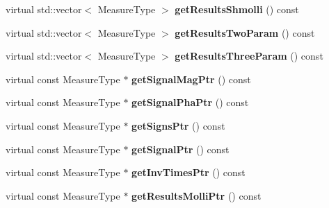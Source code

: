 \begin{DoxyCompactItemize}
\item 
\hypertarget{class_ox_1_1_test_data_aece21264e7f357c50e2d157f077127f5}{virtual std\-::vector$<$ Measure\-Type $>$ {\bfseries get\-Results\-Shmolli} () const }\label{class_ox_1_1_test_data_aece21264e7f357c50e2d157f077127f5}

\item 
\hypertarget{class_ox_1_1_test_data_a594d22cee0f18a220811c323d5e59ff4}{virtual std\-::vector$<$ Measure\-Type $>$ {\bfseries get\-Results\-Two\-Param} () const }\label{class_ox_1_1_test_data_a594d22cee0f18a220811c323d5e59ff4}

\item 
\hypertarget{class_ox_1_1_test_data_a958d75edb7d2b4a3ef54c7d36283fae8}{virtual std\-::vector$<$ Measure\-Type $>$ {\bfseries get\-Results\-Three\-Param} () const }\label{class_ox_1_1_test_data_a958d75edb7d2b4a3ef54c7d36283fae8}

\item 
\hypertarget{class_ox_1_1_test_data_a9f625acf214f62d6cdfee00c924ef9b0}{virtual const Measure\-Type $\ast$ {\bfseries get\-Signal\-Mag\-Ptr} () const }\label{class_ox_1_1_test_data_a9f625acf214f62d6cdfee00c924ef9b0}

\item 
\hypertarget{class_ox_1_1_test_data_aafe59c86537fb24e513443e34f2b506d}{virtual const Measure\-Type $\ast$ {\bfseries get\-Signal\-Pha\-Ptr} () const }\label{class_ox_1_1_test_data_aafe59c86537fb24e513443e34f2b506d}

\item 
\hypertarget{class_ox_1_1_test_data_a98127c877fabc49a7112489e928cda05}{virtual const Measure\-Type $\ast$ {\bfseries get\-Signs\-Ptr} () const }\label{class_ox_1_1_test_data_a98127c877fabc49a7112489e928cda05}

\item 
\hypertarget{class_ox_1_1_test_data_a7c52dbd7292dfafd5e9d95eb9d701e19}{virtual const Measure\-Type $\ast$ {\bfseries get\-Signal\-Ptr} () const }\label{class_ox_1_1_test_data_a7c52dbd7292dfafd5e9d95eb9d701e19}

\item 
\hypertarget{class_ox_1_1_test_data_ad6f19708661e0722df977b8dacbf88e7}{virtual const Measure\-Type $\ast$ {\bfseries get\-Inv\-Times\-Ptr} () const }\label{class_ox_1_1_test_data_ad6f19708661e0722df977b8dacbf88e7}

\item 
\hypertarget{class_ox_1_1_test_data_a1cb0dc25db322b7ba075e0ab7f5d6567}{virtual const Measure\-Type $\ast$ {\bfseries get\-Results\-Molli\-Ptr} () const }\label{class_ox_1_1_test_data_a1cb0dc25db322b7ba075e0ab7f5d6567}


\end{DoxyCompactItemize}
